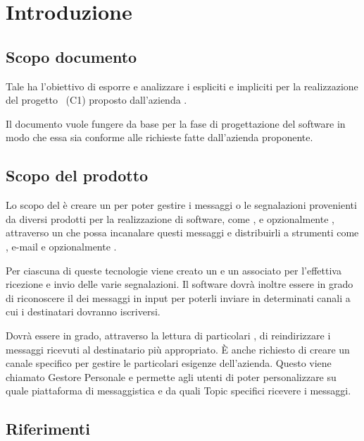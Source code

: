\newpage
\section{Introduzione}\label{Introduzione}

	

	\subsection{Scopo documento}
	Tale  ha l'obiettivo di esporre e analizzare i  espliciti e impliciti per la realizzazione del progetto \progetto\ (C1) proposto dall'azienda \II.

	Il documento vuole fungere da base per la fase di progettazione del software in modo che essa sia conforme alle richieste fatte dall'azienda proponente.

    
    \subsection{Scopo del prodotto}
	Lo scopo del  è creare un  per poter gestire i messaggi o le segnalazioni provenienti da diversi prodotti per la realizzazione di software, come ,  e opzionalmente , attraverso un  che possa incanalare questi messaggi e distribuirli a strumenti come	, e-mail e opzionalmente .\par
	Per ciascuna di queste tecnologie viene creato un  e un  associato per l'effettiva ricezione e invio delle varie segnalazioni.
	Il software dovrà inoltre essere in grado di riconoscere il  dei messaggi in input per poterli inviare in determinati canali a cui i
	destinatari dovranno iscriversi.\par
	Dovrà essere in grado, attraverso la lettura di	particolari	, di reindirizzare i messaggi ricevuti al destinatario più appropriato. 
	\`E anche richiesto di creare un canale specifico per gestire le particolari esigenze dell'azienda. 
	Questo viene chiamato Gestore Personale e permette agli utenti di poter personalizzare su quale piattaforma di messaggistica e da quali Topic specifici ricevere i messaggi.

	\subsection{Riferimenti}

